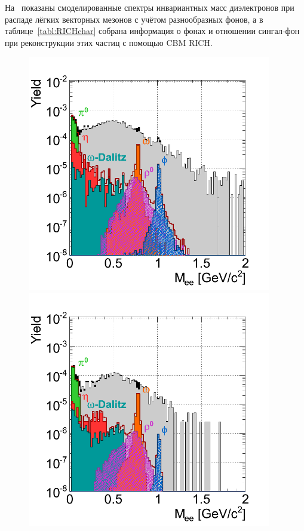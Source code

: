 
На~ показаны смоделированные спектры инвариантных масс диэлектронов при распаде лёгких векторных мезонов с учётом разнообразных фонов, а в таблице~\ref{tabl:RICHchar} собрана информация о фонах и отношении сингал-фон при реконструкции этих частиц с помощью CBM RICH.

\begin{figure}[H]
\begin{minipage}[t]{0.495\textwidth}
\includegraphics[width=0.95\textwidth]{pictures/InvMassSpectr1.png}
\end{minipage}
\begin{minipage}[t]{0.495\textwidth}
\includegraphics[width=0.95\textwidth]{pictures/InvMassSpectr2.png}

\end{minipage}
\end{figure}
